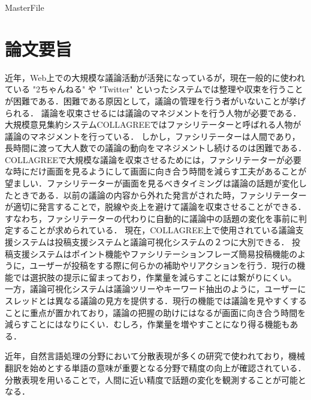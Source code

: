 \expandafter\ifx\csname MasterFile\endcsname\relax
\def\SubFile{hoge}


\fi
\cleardoublepage
\chapter*{論文要旨}
近年，Web上での大規模な議論活動が活発になっているが，現在一般的に使われている "2ちゃんねる" や "Twitter" といったシステムでは整理や収束を行うことが困難である．困難である原因として，議論の管理を行う者がいないことが挙げられる．
議論を収束させるには議論のマネジメントを行う人物が必要である．
%
大規模意見集約システムCOLLAGREEではファシリテーターと呼ばれる人物が議論のマネジメントを行っている．
しかし，ファシリテーターは人間であり，長時間に渡って大人数での議論の動向をマネジメントし続けるのは困難である．
%
COLLAGREEで大規模な議論を収束させるためには，ファシリテーターが必要な時にだけ画面を見るようにして画面に向き合う時間を減らす工夫があることが望ましい．ファシリテーターが画面を見るべきタイミングは議論の話題が変化したときである．以前の議論の内容から外れた発言がされた時，ファシリテーターが適切に発言することで，脱線や炎上を避けて議論を収束させることができる．
すなわち，ファシリテーターの代わりに自動的に議論中の話題の変化を事前に判定することが求められている．
%
現在，COLLAGREE上で使用されている議論支援システムは投稿支援システムと議論可視化システムの２つに大別できる．
投稿支援システムはポイント機能やファシリテーションフレーズ簡易投稿機能のように，ユーザーが投稿をする際に何らかの補助やリアクションを行う．現行の機能では選択肢の提示に留まっており，作業量を減らすことには繋がりにくい。
一方，議論可視化システムは議論ツリーやキーワード抽出のように，ユーザーにスレッドとは異なる議論の見方を提供する．現行の機能では議論を見やすくすることに重点が置かれており，議論の把握の助けにはなるが画面に向き合う時間を減らすことにはなりにくい．むしろ，作業量を増やすことになり得る機能もある．
\begin{comment}
ポイント機能(ユーザの議論行動を活性化)-1
ファシリテーションフレーズ簡易投稿機能-1
議論ツリー-2
１文の要約，スレッドの要約，クラスタリング，返信意見の極性判定-2
ファシリテーションスタンプ-1
キーワード抽出-2
いいね機能-1
いいねランキング-2
投票機能-1
議論フェーズ機能-2
1-意見を出す、投稿をする際に補助や選択肢、リアクションを与える
2-議論の別の見方を提供する
\end{comment}
%
近年，自然言語処理の分野において分散表現が多くの研究で使われており，機械翻訳を始めとする単語の意味が重要となる分野で精度の向上が確認されている．分散表現を用いることで，人間に近い精度で話題の変化を観測することが可能となる．
